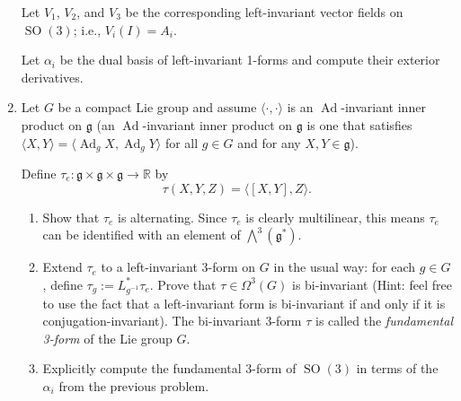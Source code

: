 \documentclass[11pt]{article}
\theoremstyle{definition}
\theoremstyle{definition}
\newcommand{\R}{{\mathbb R}}
\newcommand{\SO}{\operatorname{SO}}
\begin{document}
\begin{enumerate}
	Let $V_1$, $V_2$, and $V_3$ be the corresponding left-invariant vector fields on $\SO(3)$; i.e., $V_i(I)=A_i$.
	
	Let $\alpha_i$ be the dual basis of left-invariant 1-forms and compute their exterior derivatives. 
	
	
	\item Let $G$ be a compact Lie group and assume $\langle \cdot , \cdot \rangle$ is an $\operatorname{Ad}$-invariant inner product on $\mathfrak{g}$ (an $\operatorname{Ad}$-invariant inner product on $\mathfrak{g}$ is one that satisfies $\langle X,Y \rangle = \langle \operatorname{Ad}_g X, \operatorname{Ad}_g Y \rangle$ for all $g \in G$ and for any $X,Y \in \mathfrak{g}$). 
	
	Define $\tau_e: \mathfrak{g} \times \mathfrak{g} \times \mathfrak{g} \to \R$ by
	\[
		\tau(X,Y,Z) = \langle [X,Y], Z\rangle.
	\]
	\begin{enumerate}
		\item Show that $\tau_e$ is alternating. Since $\tau_e$ is clearly multilinear, this means $\tau_e$ can be identified with an element of $\bigwedge^3(\mathfrak{g}^*)$.
		\item Extend $\tau_e$ to a left-invariant 3-form on $G$ in the usual way: for each $g \in G$, define $\tau_g := L_{g^{-1}}^* \tau_e$. Prove that $\tau \in \Omega^3(G)$ is bi-invariant (Hint: feel free to use the fact that a left-invariant form is bi-invariant if and only if it is conjugation-invariant). The bi-invariant 3-form $\tau$ is called the \emph{fundamental 3-form} of the Lie group $G$.
		\item Explicitly compute the fundamental 3-form of $\SO(3)$ in terms of the $\alpha_i$ from the previous problem. 
	\end{enumerate}
		
		 
\end{enumerate}


	
	
\end{document}
